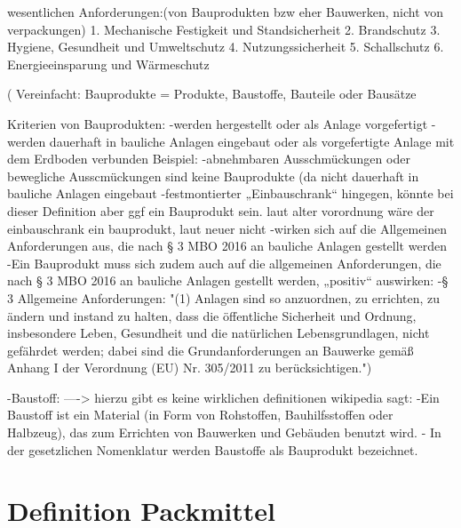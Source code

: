             wesentlichen Anforderungen:(von Bauprodukten bzw eher Bauwerken, nicht von verpackungen)%
                1. Mechanische Festigkeit und Standsicherheit
                2. Brandschutz
                3. Hygiene, Gesundheit und Umweltschutz
                4. Nutzungssicherheit
                5. Schallschutz
                6. Energieeinsparung und Wärmeschutz
            
            
        ( %
            Vereinfacht: Bauprodukte = Produkte, Baustoffe, Bauteile oder Bausätze
            
            Kriterien von Bauprodukten: 
                    -werden hergestellt oder als Anlage vorgefertigt
                    -werden dauerhaft in bauliche Anlagen eingebaut oder als vorgefertigte Anlage mit dem Erdboden verbunden
                        Beispiel:
                        -abnehmbaren Ausschmückungen oder bewegliche Ausscmückungen sind keine Bauprodukte (da nicht dauerhaft in bauliche Anlagen eingebaut
                        -festmontierter „Einbauschrank“ hingegen, könnte bei dieser Definition aber ggf ein Bauprodukt sein. laut alter vorordnung wäre der einbauschrank ein bauprodukt, laut neuer nicht
                    -wirken sich auf die Allgemeinen Anforderungen aus, die nach § 3    MBO 2016 an bauliche Anlagen gestellt werden
                        -Ein Bauprodukt muss sich zudem auch auf die allgemeinen Anforderungen, die nach § 3 MBO 2016 an bauliche Anlagen gestellt werden, „positiv“ auswirken:
                        -§ 3 Allgemeine Anforderungen:
                            "(1) Anlagen sind so anzuordnen, zu errichten, zu ändern und instand zu halten, dass die öffentliche Sicherheit und Ordnung, insbesondere Leben, Gesundheit und die natürlichen Lebensgrundlagen, nicht gefährdet werden; dabei sind die Grundanforderungen an Bauwerke gemäß Anhang I der Verordnung (EU) Nr. 305/2011 zu berücksichtigen.")
            
    -Baustoff:   ----> hierzu gibt es keine wirklichen definitionen
            wikipedia sagt: %
                    -Ein Baustoff ist ein Material (in Form von Rohstoffen, Bauhilfsstoffen oder Halbzeug), das zum Errichten von Bauwerken und Gebäuden benutzt wird. 
                    - In der gesetzlichen Nomenklatur werden Baustoffe als Bauprodukt bezeichnet.
                    

\section{Definition Packmittel}
\label{sec:Definitionen:Definition Packmittel}

